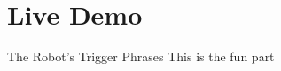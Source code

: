 \section{Live Demo}
    
    \frame{\sectionpage}
    
    \begin{frame}{The Robot's Trigger Phrases}
         \centering
         \huge{This is the fun part}
    \end{frame}
